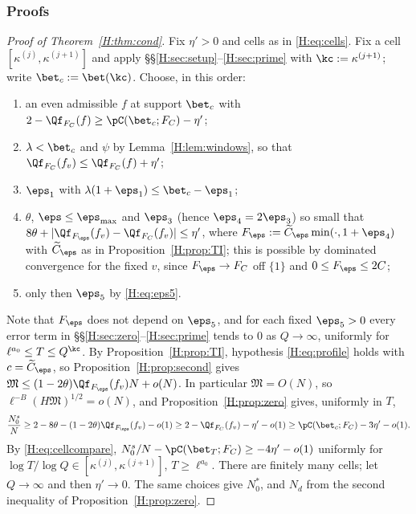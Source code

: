 \subsubsection*{Proofs}\label{H:sec:proofs}
\begin{proof}[Proof of Theorem~\ref{H:thm:cond}]
Fix $\eta'>0$ and cells as in \eqref{H:eq:cells}. Fix a cell $[\kappa^{(j)},\kappa^{(j+1)}]$ and apply \S\S\ref{H:sec:setup}--\ref{H:sec:prime} with $\kc:=\kappa^{(j+1)}$; write $\bet_c:=\bet(\kc)$. Choose, in this order:
\begin{enumerate}[label=(\alph*),leftmargin=*]
\item an even admissible $f$ at support $\bet_c$ with $2-\Qf_{F_C}(f)\ge\pC(\bet_c;F_C)-\eta'$;
\item $\lambda<\bet_c$ and $\psi$ by Lemma~\ref{H:lem:windows}, so that $\Qf_{F_C}(f_v)\le\Qf_{F_C}(f)+\eta'$;
\item $\eps_1$ with $\lambda(1+\eps_1)\le\bet_c-\eps_1$;
\item $\theta$, $\eps\le\eps_{\max}$ and $\eps_3$ (hence $\eps_4=2\eps_3$) so small that $8\theta+|\Qf_{F_\eps}(f_v)-\Qf_{F_C}(f_v)|\le\eta'$, where $F_\eps:=\widetilde C_\eps\min(\cdot,1+\eps_4)$ with $\widetilde C_\eps$ as in Proposition~\ref{H:prop:TI}; this is possible by dominated convergence for the fixed $v$, since $F_\eps\to F_C$ off $\{1\}$ and $0\le F_\eps\le2C$;
\item only then $\eps_5$ by \eqref{H:eq:eps5}.
\end{enumerate}
Note that $F_\eps$ does not depend on $\eps_5$, and for each fixed $\eps_5>0$ every error term in \S\S\ref{H:sec:zero}--\ref{H:sec:prime} tends to $0$ as $Q\to\infty$, uniformly for $\ell^{a_0}\le T\le Q^{\kc}$. By Proposition~\ref{H:prop:TI}, hypothesis \eqref{H:eq:profile} holds with $c=\widetilde C_\eps$, so Proposition~\ref{H:prop:second} gives $\mathfrak M\le(1-2\theta)\Qf_{F_\eps}(f_v)N+o(N)$. In particular $\mathfrak M=O(N)$, so $\ell^{-B}(H\mathfrak M)^{1/2}=o(N)$, and Proposition~\ref{H:prop:zero} gives, uniformly in $T$,
\[
\frac{N^s_0}N\ge2-8\theta-(1-2\theta)\Qf_{F_\eps}(f_v)-o(1)\ge2-\Qf_{F_C}(f_v)-\eta'-o(1)\ge\pC(\bet_c;F_C)-3\eta'-o(1).
\]
By \eqref{H:eq:cellcompare}, $N^s_0/N-\pC(\bet_T;F_C)\ge-4\eta'-o(1)$ uniformly for $\log T/\log Q\in[\kappa^{(j)},\kappa^{(j+1)}]$, $T\ge\ell^{a_0}$. There are finitely many cells; let $Q\to\infty$ and then $\eta'\to0$. The same choices give $N^*_0$, and $N_d$ from the second inequality of Proposition~\ref{H:prop:zero}.
\end{proof}

